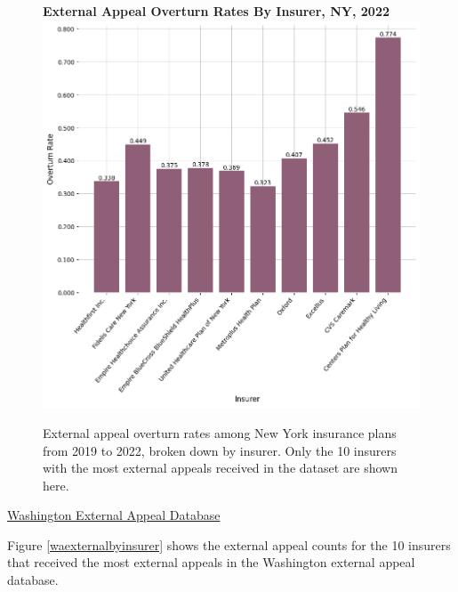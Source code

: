 \documentclass[12pt, a4paper,twoside]{report}
\theoremstyle{plain} %
\theoremstyle{definition} %
\theoremstyle{remark} %
\numberwithin{equation}{chapter}
\begin{document}
		
		\begin{figure}[h!]
			\centering
			\textbf{External Appeal Overturn Rates By Insurer, NY, 2022}
			\includegraphics[width=.8\textwidth]{images/nys_external/overturn_rates_by_insurer.png}
			\caption{External appeal overturn rates among New York insurance plans from 2019 to 2022, broken down by insurer. Only the 10 insurers with the most external appeals received in the dataset are shown here.}
			\label{nyexternaloverturnsbyinsurer}
		\end{figure}
	
	
		\underline{Washington External Appeal Database}

		Figure \ref{waexternalbyinsurer} shows the external appeal counts for the 10 insurers that received the most external appeals in the Washington external appeal database.
		
\end{document}
